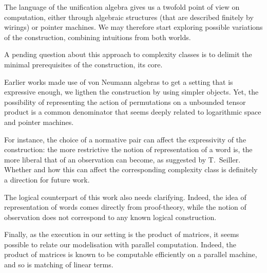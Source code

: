 The language of the unification algebra gives us a twofold point of view on computation, either through algebraic structures (that are described finitely by wirings) or pointer machines.
We may therefore start exploring possible variations of the construction, combining intuitions from both worlds.



\smallskip
A pending question about this approach to complexity classes is to delimit the minimal prerequisites of the construction, its core.

Earlier works \cite{girard_normativity_2012,aubert_characterizing_2012,seiller_logarithmic_2013} made use of von Neumann algebras to get a setting that is expressive enough, we ligthen the construction by using simpler objects.
Yet, the possibility of representing the action of permutations on a unbounded tensor product is a common denominator that seems deeply related to logarithmic space and pointer machines.

\smallskip
For instance, the choice of a normative pair can affect the expressivity of the construction:
the more restrictive the notion of representation of a word is, the more liberal that of an observation can become, as suggested by T.~Seiller.
Whether and how this can affect the corresponding complexity class is definitely a direction for future work.

\smallskip
The logical counterpart of this work also needs clarifying.
Indeed, the idea of representation of words comes directly from proof-theory, while the notion of observation does not correspond to any known logical construction.

\smallskip
Finally, as the execution in our setting is the product of matrices, it seems possible to relate our modelisation with parallel computation. Indeed, the product of matrices is known to be computable efficiently on a parallel machine, and so is matching of linear terms.
